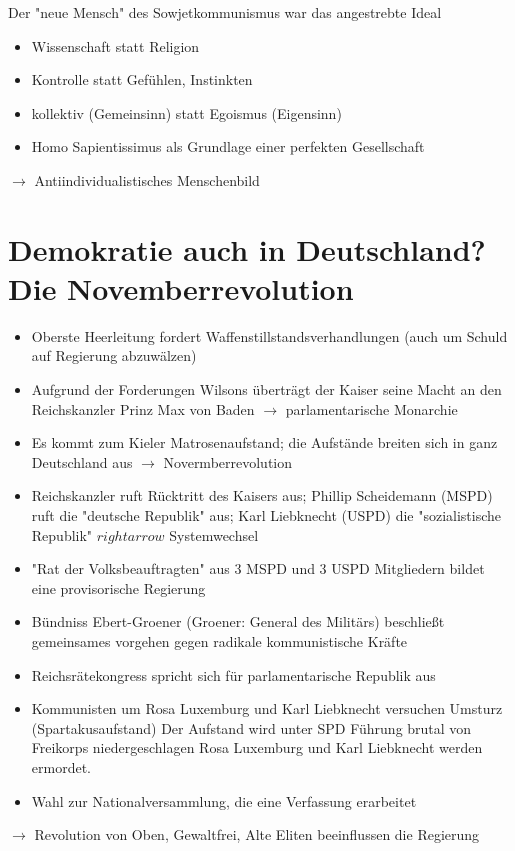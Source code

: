 \documentclass{article}
\begin{document}
Der "neue Mensch" des Sowjetkommunismus war das angestrebte Ideal
\begin{itemize}
    \item Wissenschaft statt Religion
    \item Kontrolle statt Gefühlen, Instinkten
    \item kollektiv (Gemeinsinn) statt Egoismus (Eigensinn)
    \item Homo Sapientissimus als Grundlage einer perfekten Gesellschaft
\end{itemize}
$\rightarrow$ Antiindividualistisches Menschenbild

\section*{ Demokratie auch in Deutschland? Die Novemberrevolution}
\begin{itemize}
    \item Oberste Heerleitung fordert Waffenstillstandsverhandlungen (auch um Schuld auf Regierung abzuwälzen)
    \item Aufgrund der Forderungen Wilsons überträgt der Kaiser
          seine Macht an den Reichskanzler Prinz Max von Baden $\rightarrow$ parlamentarische Monarchie
    \item Es kommt zum Kieler Matrosenaufstand; die Aufstände breiten
          sich in ganz Deutschland aus $\rightarrow$ Novermberrevolution
    \item Reichskanzler ruft Rücktritt des Kaisers aus;
          Phillip Scheidemann (MSPD) ruft die "deutsche Republik" aus;
          Karl Liebknecht (USPD) die "sozialistische Republik" $rightarrow$ Systemwechsel
    \item "Rat der Volksbeauftragten" aus 3 MSPD und 3 USPD
          Mitgliedern bildet eine provisorische Regierung
    \item Bündniss Ebert-Groener (Groener: General des Militärs) beschließt
          gemeinsames vorgehen gegen radikale kommunistische Kräfte
    \item Reichsrätekongress spricht sich für parlamentarische Republik aus
    \item Kommunisten um Rosa Luxemburg und Karl Liebknecht versuchen Umsturz (Spartakusaufstand)
          Der Aufstand wird unter SPD Führung brutal von Freikorps niedergeschlagen
          Rosa Luxemburg und Karl Liebknecht werden ermordet.
    \item Wahl zur Nationalversammlung, die eine Verfassung erarbeitet
\end{itemize}
$\rightarrow$ Revolution von Oben, Gewaltfrei, Alte Eliten beeinflussen die Regierung
\end{document}
